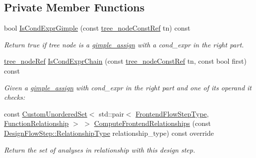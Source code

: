 \subsection*{Private Member Functions}
\begin{DoxyCompactItemize}
\item 
bool \hyperlink{classCondExprRestructuring_ac55548adeb0d01cba83cfe39a2e5e17d}{Is\+Cond\+Expr\+Gimple} (const \hyperlink{tree__node_8hpp_a3cf5d02292c940f3892425a5b5fdec3c}{tree\+\_\+node\+Const\+Ref} tn) const
\begin{DoxyCompactList}\small\item\em Return true if tree node is a \hyperlink{structgimple__assign}{gimple\+\_\+assign} with a cond\+\_\+expr in the right part. \end{DoxyCompactList}\item 
\hyperlink{tree__node_8hpp_a6ee377554d1c4871ad66a337eaa67fd5}{tree\+\_\+node\+Ref} \hyperlink{classCondExprRestructuring_adc2b20c01958cd9200e7da26103220ee}{Is\+Cond\+Expr\+Chain} (const \hyperlink{tree__node_8hpp_a3cf5d02292c940f3892425a5b5fdec3c}{tree\+\_\+node\+Const\+Ref} tn, const bool first) const
\begin{DoxyCompactList}\small\item\em Given a \hyperlink{structgimple__assign}{gimple\+\_\+assign} with cond\+\_\+expr in the right part and one of its operand it checks\+: \end{DoxyCompactList}\item 
const \hyperlink{classCustomUnorderedSet}{Custom\+Unordered\+Set}$<$ std\+::pair$<$ \hyperlink{frontend__flow__step_8hpp_afeb3716c693d2b2e4ed3e6d04c3b63bb}{Frontend\+Flow\+Step\+Type}, \hyperlink{classFrontendFlowStep_af7cf30f2023e5b99e637dc2058289ab0}{Function\+Relationship} $>$ $>$ \hyperlink{classCondExprRestructuring_a837db1066d7025261bde7b43ae4c7f86}{Compute\+Frontend\+Relationships} (const \hyperlink{classDesignFlowStep_a723a3baf19ff2ceb77bc13e099d0b1b7}{Design\+Flow\+Step\+::\+Relationship\+Type} relationship\+\_\+type) const override
\begin{DoxyCompactList}\small\item\em Return the set of analyses in relationship with this design step. \end{DoxyCompactList}\end{DoxyCompactItemize}

